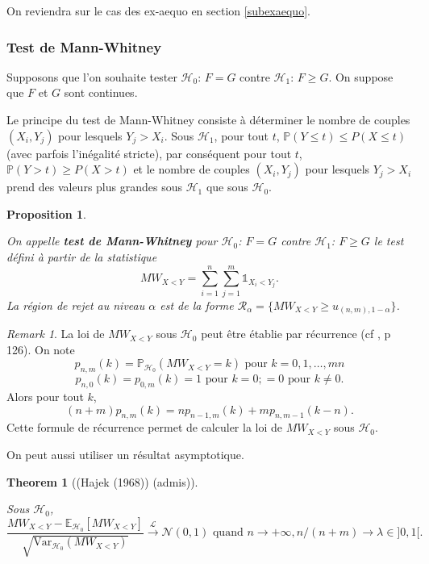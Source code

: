 \documentclass[
]{book}
\newtheorem{theorem}{Theorem}[chapter]
\newtheorem{proposition}{Proposition}[chapter]
\theoremstyle{definition}
\theoremstyle{definition}
\theoremstyle{definition}
\theoremstyle{definition}
\theoremstyle{remark}
\newtheorem*{remark}{Remark}
\begin{document}
On reviendra sur le cas des ex-aequo en section \ref{subexaequo}.

\hypertarget{test-de-mann-whitney}{%
\subsubsection{Test de Mann-Whitney}\label{test-de-mann-whitney}}

Supposons que l'on souhaite tester \(\mathcal{H}_0\): \(F=G\) contre \(\mathcal{H}_1\): \(F \geq G\). On suppose que \(F\) et \(G\) sont continues.

Le principe du test de Mann-Whitney consiste à déterminer le nombre de couples \((X_i, Y_j)\) pour lesquels \(Y_j > X_i\). Sous \(\mathcal{H}_1\), pour tout \(t\), \(\mathbb{P}(Y\leq t) \leq P(X\leq t)\) (avec parfois l'inégalité stricte), par conséquent pour tout \(t\), \(\mathbb{P}(Y> t) \geq P(X > t)\) et le nombre de couples \((X_i, Y_j)\) pour lesquels \(Y_j > X_i\) prend des valeurs plus grandes sous \(\mathcal{H}_1\) que sous \(\mathcal{H}_0\).

\begin{proposition}
\protect\hypertarget{prp:unlabeled-div-28}{}\label{prp:unlabeled-div-28}

On appelle \textbf{test de Mann-Whitney} pour \(\mathcal{H}_0\): \(F=G\) contre \(\mathcal{H}_1\): \(F \geq G\) le test défini à partir de la statistique
\[ 
    MW_{X<Y} = \sum_{i=1}^n \sum_{j=1}^m \mathbb{1}_{X_i <Y_j}.
\]
La région de rejet au niveau \(\alpha\) est de la forme \(\mathcal R_{\alpha} = \{MW_{X<Y}\geq u_{(n,m),1-\alpha} \}\).

\end{proposition}

\begin{remark}

La loi de \(MW_{X<Y}\) sous \(\mathcal{H}_0\) peut être établie par récurrence (cf \citet{CaperaaCutsem}, p 126). On note
\[p_{n,m}(k)=\mathbb{P}_{\mathcal{H}_0}( MW_{X<Y} =k) \mbox{ pour } k=0,1, \ldots, mn\]
\[p_{n,0}(k)=p_{0,m}(k)=1  \mbox{ pour } k=0; =0 \mbox{ pour } k\neq 0.\]
Alors pour tout \(k\),
\[ (n+m)p_{n,m}(k)=n p_{n-1,m}(k)+ m p_{n,m-1}(k-n).\]
Cette formule de récurrence permet de calculer la loi de \(MW_{X<Y}\) sous \(\mathcal{H}_0\).

\end{remark}

On peut aussi utiliser un résultat asymptotique.

\begin{theorem}[(Hajek (1968)) (admis)]
\protect\hypertarget{thm:unlabeled-div-30}{}\label{thm:unlabeled-div-30}

Sous \(\mathcal{H}_0\),
\[\frac{MW_{X<Y} -\mathbb{E}_{\mathcal{H}_0}[MW_{X<Y}]}{\sqrt{\mbox{Var}_{\mathcal{H}_0}(MW_{X<Y})}} \stackrel{\mathcal L}{\longrightarrow} \mathcal{N}(0,1)
\mbox{ quand } n\rightarrow +\infty, n/(n+m) \rightarrow \lambda \in ]0,1[.\]

\end{theorem}
\end{document}
